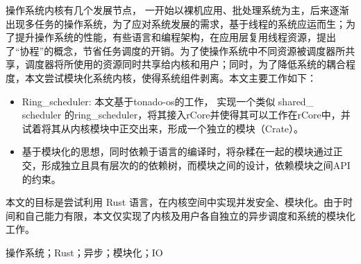 \setlength{\headheight}{1.5cm}

\abstractcn


\begin{spacing}{1.625}
操作系统内核有几个发展节点， 一开始以裸机应用、批处理系统为主，后来逐渐出现多任务的操作系统，为了应对系统发展的需求，基于线程的系统应运而生；为了提升操作系统的性能，有些语言和编程架构，在应用层复用线程资源，提出了“协程”的概念，节省任务调度的开销。为了使操作系统中不同资源被调度器所共享，调度器将所使用的资源同时共享给内核和用户；同时，为了降低系统的耦合程度，本文尝试模块化系统内核，使得系统组件剥离。本文主要工作如下：
\begin{itemize}
\item Ring\_scheduler: 本文基于tonado-os的工作， 实现一个类似 shared\_ scheduler 的ring\_scheduler，将其接入rCore并使得其可以工作在rCore中，并试着将其从内核模块中正交出来，形成一个独立的模块（Crate）。 

\item 基于模块化的思想，同时依赖于语言的编译时，将杂糅在一起的模块通过正交，形成独立且具有层次的的依赖树，而模块之间的设计，依赖模块之间API的约束。
\end{itemize}
本文的目标是尝试利用 Rust 语言，在内核空间中实现并发安全、模块化。由于时间和自己能力有限，本文仅实现了内核及用户各自独立的异步调度和系统的模块化工作。

\keywordscn\quad 操作系统；Rust；异步；模块化；IO
\end{spacing}
\let\cleardoublepage\clearpage
\abstracten

